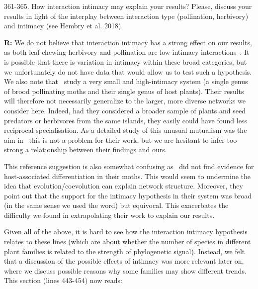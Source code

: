 \documentclass[12pt]{letter}
\newenvironment{refquote}{\bigskip \begin{it}}{\end{it}\smallskip}
\begin{document}
		\begin{refquote}
			361-365. How interaction intimacy may explain your results? Please, discuss your results in light of the interplay between interaction type (pollination, herbivory) and intimacy (see Hembry et al. 2018).
		\end{refquote}


		\textbf{R:} We do not believe that interaction intimacy has a strong effect on our results, as both leaf-chewing herbivory and pollination are low-intimacy interactions~\citep{Astegiano2017}. It is possible that there is variation in intimacy within these broad categories, but we unfortunately do not have data that would allow us to test such a hypothesis. We also note that~\citet{Hembry2018} study a very small and high-intimacy system (a single genus of brood pollinating moths and their single genus of host plants). Their results will therefore not necessarily generalize to the larger, more diverse networks we consider here. Indeed, had they considered a broader sample of plants and seed predators or herbivores from the same islands, they easily could have found less reciprocal specialisation. As a detailed study of this unusual mutualism was the aim in~\citet{Hembry2018} this is not a problem for their work, but we are hesitant to infer too strong a relationship between their findings and ours.


		This reference suggestion is also somewhat confusing as~\citet{Hembry2018} did not find evidence for host-associated differentiation in their moths. This would seem to undermine the idea that evolution/coevolution can explain network structure. Moreover, they point out that the support for the intimacy hypothesis  in their system was broad (in the same sense we used the word) but equivocal. This exacerbates the difficulty we found in extrapolating their work to explain our results.


		Given all of the above, it is hard to see how the interaction intimacy hypothesis relates to these lines (which are about whether the number of species in different plant families is related to the strength of phylogenetic signal). Instead, we felt that a discussion of the possible effects of intimacy was more relevant later on, where we discuss possible reasons why some families may show different trends. This section (lines 443-454) now reads:
\end{document}
